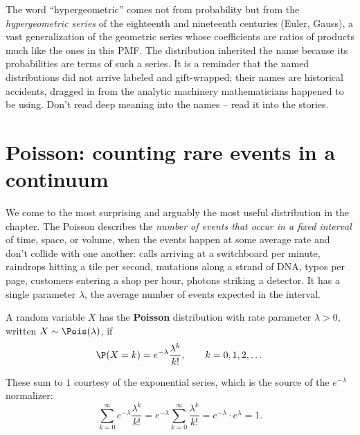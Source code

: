 \begin{historybox}
The word ``hypergeometric'' comes not from probability but from the
\emph{hypergeometric series} of the eighteenth and nineteenth centuries (Euler,
Gauss), a vast generalization of the geometric series whose coefficients are
ratios of products much like the ones in this PMF. The distribution inherited the
name because its probabilities are terms of such a series. It is a reminder that
the named distributions did not arrive labeled and gift-wrapped; their names are
historical accidents, dragged in from the analytic machinery mathematicians
happened to be using. Don't read deep meaning into the names -- read it into the
stories.
\end{historybox}

\section{Poisson: counting rare events in a continuum}
\label{ch07:poisson}

We come to the most surprising and arguably the most useful distribution in the
chapter. The Poisson describes the \emph{number of events that occur in a fixed
interval} of time, space, or volume, when the events happen at some average rate
and don't collide with one another: calls arriving at a switchboard per minute,
raindrops hitting a tile per second, mutations along a strand of DNA, typos per
page, customers entering a shop per hour, photons striking a detector. It has a
single parameter $\lambda$, the average number of events expected in the interval.

\begin{definition}
\label{ch07:def-poisson}
A random variable $X$ has the \textbf{Poisson} distribution with rate parameter
$\lambda > 0$, written $X \sim \Pois(\lambda)$, if
\[
  \P(X = k) = e^{-\lambda} \frac{\lambda^{k}}{k!}, \qquad k = 0, 1, 2, \dots
\]
\end{definition}

These sum to $1$ courtesy of the exponential series, which is the source of the
$e^{-\lambda}$ normalizer:
\[
  \sum_{k=0}^{\infty} e^{-\lambda} \frac{\lambda^{k}}{k!}
  = e^{-\lambda} \sum_{k=0}^{\infty} \frac{\lambda^{k}}{k!}
  = e^{-\lambda} \cdot e^{\lambda} = 1.
\]

